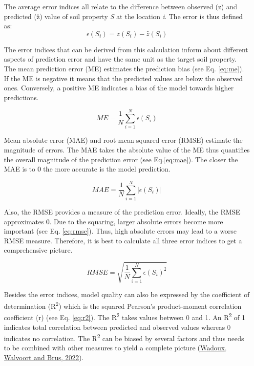 \documentclass[
  10pt,
  b5paper,
  oneside]{book}
\begin{document}
The average error indices all relate to the difference between observed (z) and predicted (ẑ) value of soil property \emph{S} at the location \emph{i}. The error \epsilon is thus defined as:
\begin{equation}
\epsilon(S_{i}) = z(S_{i}) - \hat{z}(S_{i})
\end{equation}

The error indices that can be derived from this calculation inform about different aspects of prediction error and have the same unit as the target soil property. The mean prediction error (ME) estimates the prediction bias (see Eq. \eqref{eq:me}). If the ME is negative it means that the predicted values are below the observed ones. Conversely, a positive ME indicates a bias of the model towards higher predictions.

\begin{equation} 
  ME = \frac{1}{N}\sum_{i=1}^{N}\epsilon(S_{i})
  \label{eq:me}
\end{equation}

Mean absolute error (MAE) and root-mean squared error (RMSE) estimate the magnitude of errors. The MAE takes the absolute value of the ME thus quantifies the overall magnitude of the prediction error (see Eq.\eqref{eq:mae}). The closer the MAE is to 0 the more accurate is the model prediction.

\begin{equation} 
  MAE = \frac{1}{N}\sum_{i=1}^{N}|\epsilon(S_{i})|
  \label{eq:mae}
\end{equation}

Also, the RMSE provides a measure of the prediction error. Ideally, the RMSE approximates 0. Due to the squaring, larger absolute errors become more important (see Eq. \eqref{eq:rmse}). Thus, high absolute errors may lead to a worse RMSE measure. Therefore, it is best to calculate all three error indices to get a comprehensive picture.

\begin{equation} 
  RMSE = \sqrt{\frac{1}{N}\sum_{i=1}^{N}\epsilon(S_{i})^{2}}
  \label{eq:rmse}
\end{equation}

Besides the error indices, model quality can also be expressed by the coefficient of determination (R\textsuperscript{2}) which is the squared Pearson's product-moment correlation coefficient (r) (see Eq. \eqref{eq:r2}). The R\textsuperscript{2} takes values between 0 and 1. An R\textsuperscript{2} of 1 indicates total correlation between predicted and observed values whereas 0 indicates no correlation. The R\textsuperscript{2} can be biased by several factors and thus needs to be combined with other measures to yield a complete picture (\protect\hyperlink{ref-Wadoux2022}{Wadoux, Walvoort and Brus, 2022}).
\end{document}
